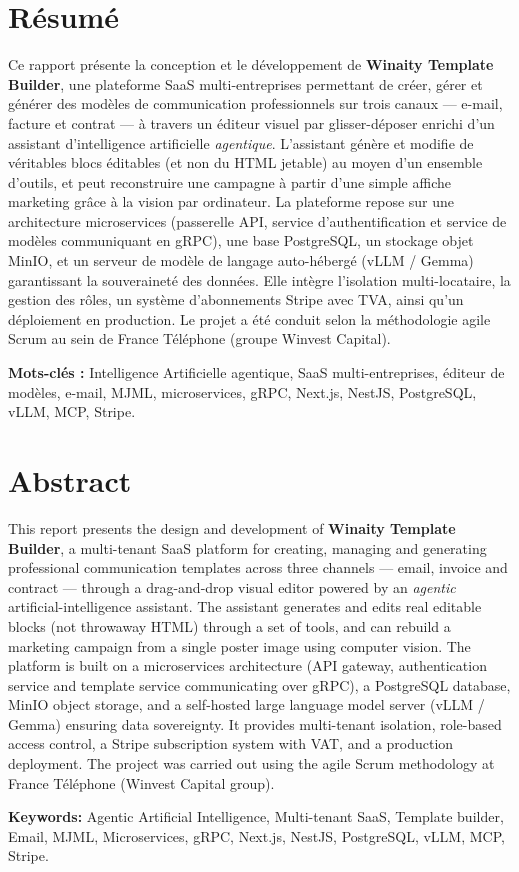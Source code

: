 \documentclass[12pt,a4paper,oneside]{report}
\begin{document}
\cleardoublepage
\thispagestyle{empty}

\section*{Résumé}
Ce rapport présente la conception et le développement de
\textbf{Winaity Template Builder}, une plateforme SaaS multi-entreprises
permettant de créer, gérer et générer des modèles de communication
professionnels sur trois canaux — e-mail, facture et contrat — à travers un
éditeur visuel par glisser-déposer enrichi d'un
assistant d'intelligence artificielle \emph{agentique}. L'assistant génère
et modifie de véritables blocs éditables (et non du HTML jetable) au moyen
d'un ensemble d'outils, et peut reconstruire une campagne à partir d'une
simple affiche marketing grâce à la vision par ordinateur. La plateforme
repose sur une architecture microservices (passerelle API, service
d'authentification et service de modèles communiquant en gRPC), une base
PostgreSQL, un stockage objet MinIO, et un serveur de modèle de langage
auto-hébergé (vLLM / Gemma) garantissant la souveraineté des données. Elle
intègre l'isolation multi-locataire, la gestion des rôles, un système
d'abonnements Stripe avec TVA, ainsi qu'un déploiement en production. Le
projet a été conduit selon la méthodologie agile Scrum au sein de
France Téléphone (groupe Winvest Capital).

\smallskip
\noindent\textbf{Mots-clés :} Intelligence Artificielle agentique, SaaS
multi-entreprises, éditeur de modèles, e-mail, MJML, microservices, gRPC,
Next.js, NestJS, PostgreSQL, vLLM, MCP, Stripe.

\vspace{1cm}

\section*{Abstract}
This report presents the design and development of
\textbf{Winaity Template Builder}, a multi-tenant SaaS platform for
creating, managing and generating professional communication templates
across three channels — email, invoice and contract — through a
drag-and-drop visual editor powered by an \emph{agentic}
artificial-intelligence assistant. The assistant generates and edits real
editable blocks (not throwaway HTML) through a set of tools, and can rebuild
a marketing campaign from a single poster image using computer vision. The
platform is built on a microservices architecture (API gateway,
authentication service and template service communicating over gRPC), a
PostgreSQL database, MinIO object storage, and a self-hosted large language
model server (vLLM / Gemma) ensuring data sovereignty. It provides
multi-tenant isolation, role-based access control, a Stripe subscription
system with VAT, and a production deployment. The project was carried out
using the agile Scrum methodology at France Téléphone (Winvest Capital
group).

\smallskip
\noindent\textbf{Keywords:} Agentic Artificial Intelligence, Multi-tenant
SaaS, Template builder, Email, MJML, Microservices, gRPC, Next.js, NestJS,
PostgreSQL, vLLM, MCP, Stripe.
\end{document}
